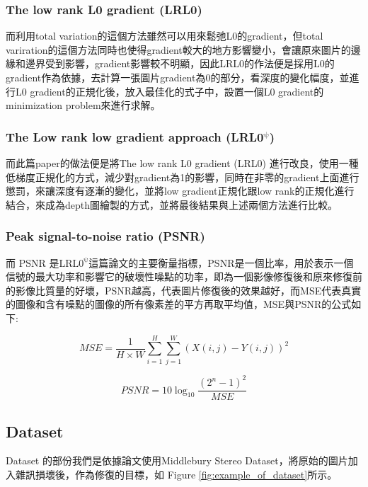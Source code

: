 \documentclass{article}
\begin{document}
\begin{CJK*}{UTF8}{bkai}
\subsubsection{The low rank L0 gradient (LRL0)}
而利用total variation的這個方法雖然可以用來鬆弛L0的gradient，但total variration的這個方法同時也使得gradient較大的地方影響變小，會讓原來圖片的邊緣和邊界受到影響，gradient影響較不明顯，因此LRL0的作法便是採用L0的gradient作為依據，去計算一張圖片gradient為0的部分，看深度的變化幅度，並進行L0 gradient的正規化後，放入最佳化的式子中，設置一個L0 gradient的minimization problem來進行求解。

\subsubsection{The Low rank low gradient approach (LRL0$\mathrm{^{\psi}}$)}
而此篇paper的做法便是將The low rank L0 gradient (LRL0)\cite{LRl0} 進行改良，使用一種低梯度正規化的方式，減少對gradient為1的影響，同時在非零的gradient上面進行懲罰，來讓深度有逐漸的變化，並將low gradient正規化跟low rank的正規化進行結合，來成為depth圖繪製的方式，並將最後結果與上述兩個方法進行比較。


\subsubsection{Peak signal-to-noise ratio (PSNR)}
而 PSNR \cite{psnr}是$\mathrm{LRL0^{\psi}}$這篇論文的主要衡量指標，PSNR是一個比率，用於表示一個信號的最大功率和影響它的破壞性噪點的功率，即為一個影像修復後和原來修復前的影像比質量的好壞，PSNR越高，代表圖片修復後的效果越好，而MSE代表真實的圖像和含有噪點的圖像的所有像素差的平方再取平均值，MSE與PSNR的公式如下:

\begin{equation}
    MSE = \frac{1}{H \times W} \sum^H_{i=1} \sum^W_{j=1} (X(i,j) - Y(i,j))^2
\end{equation}

\begin{equation}
    PSNR = 10 \log_{10} \frac{(2^n-1)^2}{MSE}
\end{equation}

\subsection{Dataset}
Dataset 的部份我們是依據論文使用Middlebury Stereo Dataset，將原始的圖片加入雜訊損壞後，作為修復的目標，如 Figure \ref{fig:example_of_dataset}所示。



\end{CJK*}
\end{document}
